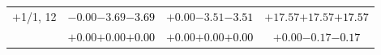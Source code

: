 \documentclass[compress]{beamer}
\begin{document}
\begin{frame}
\begin{tabular}{r | c | c | c}
$+$1/1, 12 & $-0.00$\hspace{0.1 cm}$-3.69$\hspace{0.1 cm}\textcolor{black}{$-3.69$} & $+0.00$\hspace{0.1 cm}$-3.51$\hspace{0.1 cm}\textcolor{black}{$-3.51$} & $+17.57$\hspace{0.1 cm}$+17.57$\hspace{0.1 cm}\textcolor{black}{$+17.57$} \\
           & $+0.00$\hspace{0.1 cm}$+0.00$\hspace{0.1 cm}\textcolor{black}{$+0.00$} & $+0.00$\hspace{0.1 cm}$+0.00$\hspace{0.1 cm}\textcolor{black}{$+0.00$} & $+0.00$\hspace{0.1 cm}$-0.17$\hspace{0.1 cm}\textcolor{black}{$-0.17$} \\
\end{tabular}
\end{frame}
\end{document}
